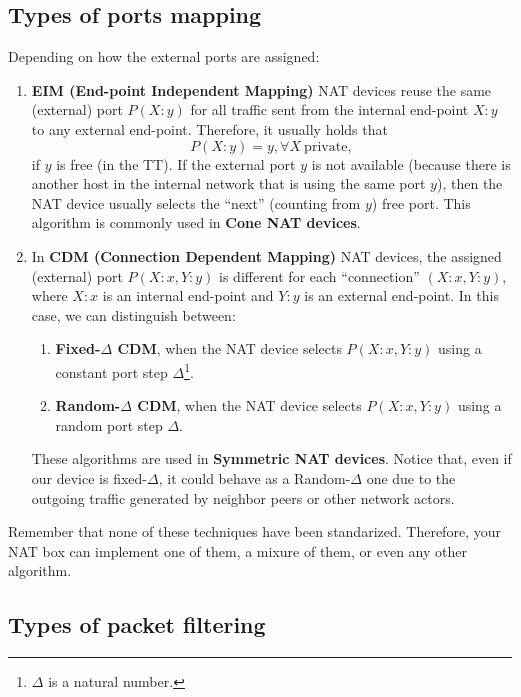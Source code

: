 \subsection{Types of ports mapping}

Depending on how the external ports are assigned:

\begin{enumerate}
\item \textbf{EIM (End-point Independent Mapping)} NAT devices reuse the same
  (external) port $P(X:y)$ for all traffic sent from the internal
  end-point $X:y$ to any external end-point. Therefore, it usually
  holds that
  \begin{equation}
    P(X:y)=y, \forall X~\mathrm{private},
  \end{equation}
  if $y$ is free (in the TT). If the external port $y$ is not
  available (because there is another host in the internal network
  that is using the same port $y$), then the NAT device usually
  selects the ``next'' (counting from $y$) free port. This algorithm
  is commonly used in \textbf{Cone NAT devices}.
\item In \textbf{CDM (Connection Dependent Mapping)} NAT devices, the assigned
  (external) port $P(X:x,Y:y)$ is different for each ``connection''
  $(X:x,Y:y)$, where $X:x$ is an internal end-point and $Y:y$ is an
  external end-point. In this case, we can distinguish between:
  \begin{enumerate}
  \item \textbf{Fixed-$\Delta$ CDM}, when the NAT device selects $P(X:x,Y:y)$
    using a constant port step $\Delta$\footnote{$\Delta$ is a natural
      number.}.
  \item \textbf{Random-$\Delta$ CDM}, when the NAT device selects $P(X:x,Y:y)$
    using a random port step $\Delta$.
  \end{enumerate}
  These algorithms are used in \textbf{Symmetric NAT devices}. Notice
  that, even if our device is fixed-$\Delta$, it could behave as a
  Random-$\Delta$ one due to the outgoing traffic generated by
  neighbor peers or other network actors.
\end{enumerate}

Remember that none of these techniques have been
standarized. Therefore, your NAT box can implement one of them, a
mixure of them, or even any other algorithm.

\subsection{Types of packet filtering}

